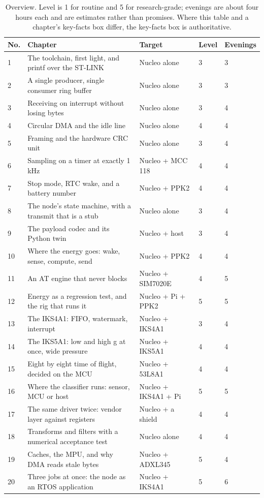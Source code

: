 \begin{table}[H]\centering\small
\begin{tabular}{p{6mm}p{74mm}p{34mm}p{12mm}p{16mm}}
\toprule
No. & Chapter & Target & Level & Evenings \\
\midrule
1 & The toolchain, first light, and printf over the ST-LINK & Nucleo alone & 3 & 3 \\
2 & A single producer, single consumer ring buffer & Nucleo alone & 3 & 3 \\
3 & Receiving on interrupt without losing bytes & Nucleo alone & 3 & 4 \\
4 & Circular DMA and the idle line & Nucleo alone & 4 & 4 \\
5 & Framing and the hardware CRC unit & Nucleo alone & 3 & 4 \\
6 & Sampling on a timer at exactly 1 kHz & Nucleo + MCC 118 & 4 & 4 \\
7 & Stop mode, RTC wake, and a battery number & Nucleo + PPK2 & 4 & 4 \\
8 & The node's state machine, with a transmit that is a stub & Nucleo alone & 3 & 4 \\
9 & The payload codec and its Python twin & Nucleo + host & 3 & 4 \\
10 & Where the energy goes: wake, sense, compute, send & Nucleo + PPK2 & 4 & 4 \\
11 & An AT engine that never blocks & Nucleo + SIM7020E & 4 & 5 \\
12 & Energy as a regression test, and the rig that runs it & Nucleo + Pi + PPK2 & 5 & 5 \\
13 & The IKS4A1: FIFO, watermark, interrupt & Nucleo + IKS4A1 & 3 & 4 \\
14 & The IKS5A1: low and high g at once, wide pressure & Nucleo + IKS5A1 & 4 & 4 \\
15 & Eight by eight time of flight, decided on the MCU & Nucleo + 53L8A1 & 4 & 4 \\
16 & Where the classifier runs: sensor, MCU or host & Nucleo + IKS4A1 + Pi & 5 & 5 \\
17 & The same driver twice: vendor layer against registers & Nucleo + a shield & 4 & 4 \\
18 & Transforms and filters with a numerical acceptance test & Nucleo alone & 4 & 4 \\
19 & Caches, the MPU, and why DMA reads stale bytes & Nucleo + ADXL345 & 5 & 4 \\
20 & Three jobs at once: the node as an RTOS application & Nucleo + IKS4A1 & 5 & 6 \\
\bottomrule
\end{tabular}
\caption{Overview. Level is 1 for routine and 5 for research-grade; evenings are about four hours each and are estimates rather than promises. Where this table and a chapter's key-facts box differ, the key-facts box is authoritative.}
\end{table}

